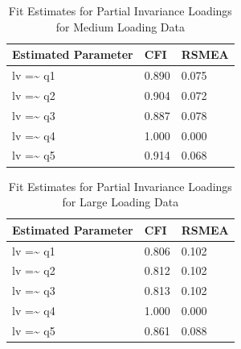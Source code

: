 \documentclass[
  man,floatsintext]{apa7}
\begin{document}
\begin{table}[tbp]

\begin{center}
\begin{threeparttable}

\caption{\label{tab:p-tab13}Fit Estimates for Partial Invariance Loadings for Medium Loading Data}

\begin{tabular}{lll}
\toprule
Estimated Parameter & CFI & RSMEA\\
\midrule
lv =\textasciitilde{} q1 & 0.890 & 0.075\\
lv =\textasciitilde{} q2 & 0.904 & 0.072\\
lv =\textasciitilde{} q3 & 0.887 & 0.078\\
lv =\textasciitilde{} q4 & 1.000 & 0.000\\
lv =\textasciitilde{} q5 & 0.914 & 0.068\\
\bottomrule
\end{tabular}

\end{threeparttable}
\end{center}

\end{table}

\begin{table}[tbp]

\begin{center}
\begin{threeparttable}

\caption{\label{tab:p-tab14}Fit Estimates for Partial Invariance Loadings for Large Loading Data}

\begin{tabular}{lll}
\toprule
Estimated Parameter & CFI & RSMEA\\
\midrule
lv =\textasciitilde{} q1 & 0.806 & 0.102\\
lv =\textasciitilde{} q2 & 0.812 & 0.102\\
lv =\textasciitilde{} q3 & 0.813 & 0.102\\
lv =\textasciitilde{} q4 & 1.000 & 0.000\\
lv =\textasciitilde{} q5 & 0.861 & 0.088\\
\bottomrule
\end{tabular}

\end{threeparttable}
\end{center}

\end{table}
\end{document}
